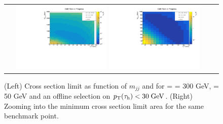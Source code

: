 \begin{figure}[tbh!]
	\centering
	\begin{tabular}{cc}
		\includegraphics[width=0.45\textwidth]{analysis/pics/JetInvMass_vs_MET_xsec_chi300_lsp050_taupt30.pdf}
		\includegraphics[width=0.45\textwidth]{analysis/pics/JetInvMass_vs_MET_xsec_chi300_lsp050_taupt30_zoom.pdf} 		
	\end{tabular}
	\caption{(Left) Cross section limit as function of $m_{jj}$ and \met for \charginopm = \neutralinotwo = 300 GeV, \neutralinoone = 50 GeV and an offline selection on $p_{\text{T}}(\tau_{\text{h}}) <  30\;\text{Ge}\kern-0.06667em\text{V}$. (Right) Zooming into the minimum cross section limit area for the same benchmark point.}
	\label{fig::JetInvMass_vs_MET_xsec_chi300_lsp050_taupt30}
\end{figure}

